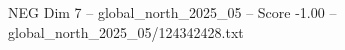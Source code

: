 \begin{textsample}{NEG Dim 7 – global\_north\_2025\_05 – Score -1.00 – global\_north\_2025\_05/124342428.txt}
\end{textsample}
